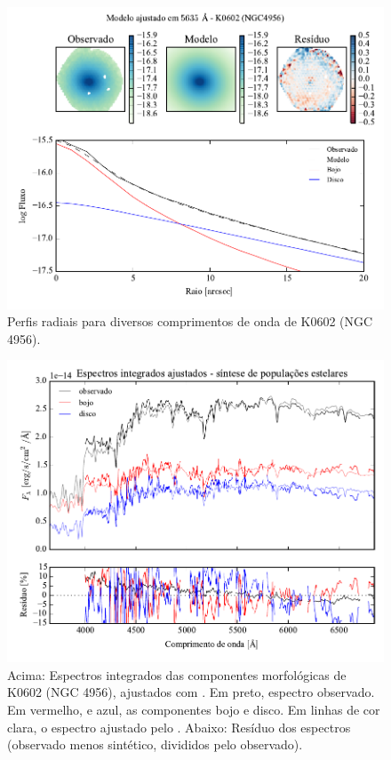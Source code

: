 \begin{figure}
	\includegraphics[page=5]{figuras-decomp/K0602_sample006a}
	\caption[Perfis radiais para diversos comprimentos de onda de K0602 (NGC 4956)]
	{Perfis radiais para diversos comprimentos de onda de K0602 (NGC 4956).}
	\label{fig:decompRadprofSpec:K0602}
\end{figure}

\begin{figure}
	\includegraphics[page=7,width=\textwidth]{figuras/sample006a_synthesis}
	\caption[Espectros ajustados com \starlight das componentes morfológicas de
	K0602 (NGC 4956)]
	{Acima: Espectros integrados das componentes morfológicas de
	K0602 (NGC 4956), ajustados com \starlight. Em preto, espectro observado. Em
	vermelho, e azul, as componentes bojo e disco. Em linhas de cor clara, o
	espectro ajustado pelo \starlight. Abaixo: Resíduo dos espectros (observado
	menos sintético, divididos pelo observado).}
	\label{fig:decompSintese:K0602}
\end{figure}


